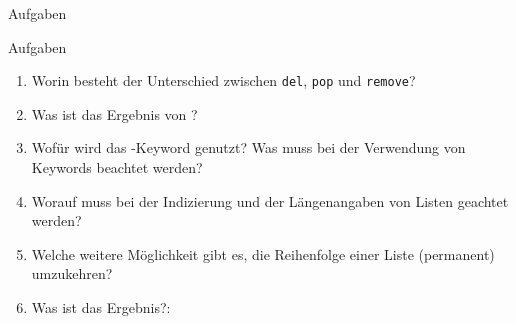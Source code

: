 \begin{subsubsection}{Aufgaben}
\begin{frame}[allowframebreaks]{Aufgaben}
\begin{enumerate}
                \item Worin besteht der Unterschied zwischen \texttt{del}, \texttt{pop} und \texttt{remove}?
                \item Was ist das Ergebnis von ?
                \item Wofür wird das -Keyword genutzt? Was muss bei der Verwendung von Keywords beachtet werden?
                \item Worauf muss bei der Indizierung und der Längenangaben von Listen geachtet werden?
                \item Welche weitere Möglichkeit gibt es, die Reihenfolge einer Liste (permanent) umzukehren?
                \item Was ist das Ergebnis?: 
            \end{enumerate}
        \end{frame}
    \end{subsubsection}
    
